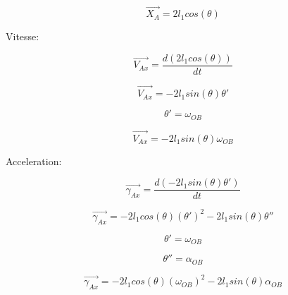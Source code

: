 \documentclass{article}
\begin{document}
\begin{equation}
\overrightarrow{X_A} = 2l_1cos(\theta)
\end{equation}

\noindent Vitesse:

\begin{equation}
\overrightarrow{V_{Ax}} = \frac{d(2l_1cos(\theta))}{dt}
\end{equation}

\begin{equation}
\overrightarrow{V_{Ax}} = -2l_1sin(\theta)\theta'
\end{equation}

\begin{equation}
\theta' = \omega_{OB}
\end{equation}

\begin{equation}
\overrightarrow{V_{Ax}} = -2l_1sin(\theta)\omega_{OB}
\end{equation}

\noindent Acceleration:

\begin{equation}
\overrightarrow{\gamma_{Ax}} = \frac{d(-2l_1sin(\theta)\theta')}{dt}
\end{equation}

\begin{equation}
\overrightarrow{\gamma_{Ax}} = -2l_1cos(\theta)(\theta')^2-2l_1sin(\theta)\theta''
\end{equation}

\begin{equation}
\theta' = \omega_{OB}
\end{equation}

\begin{equation}
\theta'' = \alpha_{OB}
\end{equation}

\begin{equation}
\overrightarrow{\gamma_{Ax}} = -2l_1cos(\theta)(\omega_{OB})^2-2l_1sin(\theta)\alpha_{OB}
\end{equation}
\end{document}
